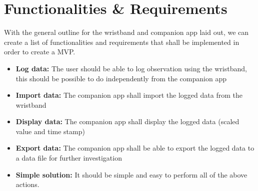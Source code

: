 \section{Functionalities \& Requirements}\label{requirements}
With the general outline for the wristband and companion app laid out, we can create a list of functionalities and requirements that shall be implemented in order to create a MVP.

\begin{itemize}
    \item \textbf{Log data:} The user should be able to log observation using the wristband, this should be possible to do independently from the companion app
    \item \textbf{Import data:} The companion app shall import the logged data from the wristband
    \item \textbf{Display data:} The companion app shall display the logged data (scaled value and time stamp)
    \item \textbf{Export data:} The companion app shall be able to export the logged data to a data file for further investigation
	\item \textbf{Simple solution:} It should be simple and easy to perform all of the above actions.
\end{itemize}